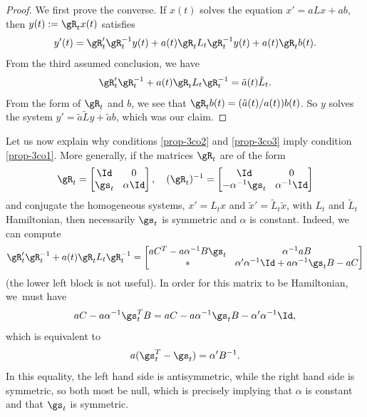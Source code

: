 \begin{proof}
We first prove the converse.
If $x(t)$ solves the equation $x'=aLx+ab$, then $y(t):= \gR_tx(t)$ satisfies
\[
y'(t)=\gR_t'\gR_t^{-1} y(t)+ a(t)\gR_t L_t\gR_t^{-1}y(t) +a(t) \gR_t b(t).
\]
From the third assumed conclusion, we have
\[
\gR_t'\gR_t^{-1} +a(t)\gR_t L_t\gR_t^{-1}=\tilde a (t)\tilde L_t.
\]
From the form of $\gR_t$ and $b$, we see that $\gR_t b(t)=(\tilde a(t)/a(t))b(t)$.
So $y$ solves the system $y'=\tilde a\tilde Ly+\tilde ab$, which was our claim.
\end{proof}

Let us now explain why conditions \eqref{prop-3co2} and \eqref{prop-3co3} imply condition \eqref{prop-3co1}.
More generally, if the matrices $\gR_t$ are of the form
\[\arraycolsep4.5pt
\gR_t=\begin{bmatrix}
\Id&0\\ \gs_t & \alpha \Id
\end{bmatrix}, \quad
(\gR_t)^{-1}=\begin{bmatrix}
\Id&0\\ -\alpha^{-1}\gs_t & \alpha^{-1} \Id
\end{bmatrix}
\]
and conjugate the homogeneous systems, $x'=L_tx$ and $\tilde x '=\tilde L_t \tilde x$, with $L_t$ and $\tilde L_t$ Hamiltonian, then necessarily $\gs_t$ is symmetric and $\alpha$ is constant.
Indeed, we can compute
\[\arraycolsep4.5pt
\gR_t'\gR_t^{-1} +a(t)\gR_t L_t\gR_t^{-1}=
\begin{bmatrix}
aC^T-a\alpha^{-1}B \gs_t&\alpha^{-1}aB\\ * & \alpha'\alpha^{-1} \Id+a\alpha^{-1}\gs_tB-aC
\end{bmatrix}
\]
(the lower left block is not useful). In order for this matrix to be Hamiltonian, we~must have
\[
aC-a\alpha^{-1}\gs_t^TB=aC-a\alpha^{-1}\gs_tB-\alpha'\alpha^{-1}\Id,
\]
which is equivalent to
\[
a(\gs_t^T-\gs_t)=\alpha'B^{-1}.
\]
In this equality, the left hand side is antisymmetric, while the right hand side is symmetric, so both most be null,
which is precisely implying that $\alpha$ is constant and that $\gs_t$ is symmetric.

